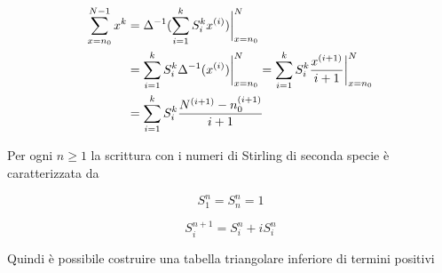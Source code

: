 \begin{example}
	\begin{align*}
		\sum
			\limits_{x=n_0}^{N-1}
			x^k
		&=
		\Delta^{-1}(
			\sum\limits_{i=1}^{k}
				S_{i}^{k}
				x^{(i)}
		)
		\bigg\rvert_{x=n_0}^{N}
		\\
		&=
		\sum\limits_{i=1}^{k}
			S_{i}^{k}
			\Delta^{-1}(
				x^{(i)}
			)
		\bigg\rvert_{x=n_0}^{N}
		=
		\sum\limits_{i=1}^{k}
			S_{i}^{k}
			\frac{
				x^{(i+1)}
			}{
				i+1
			}
		\bigg\rvert_{x=n_0}^{N}
		\\
		&=
		\sum\limits_{i=1}^{k}
			S_{i}^{k}
			\frac{
				N^{(i+1)} - n_0^{(i+1)}
			}{
				i+1
			}
	\end{align*}
\end{example}

\begin{theorem}
	Per ogni $n \geq 1$ la scrittura con i numeri di Stirling di seconda specie è caratterizzata da 
	
	$$ S_{1}^{n} = S_{n}^{n} = 1$$
	
	$$ S_{i}^{n+1} = S_{i}^{n} + i S_{i}^{n}$$
	
	Quindi è possibile costruire una tabella triangolare inferiore di termini positivi
		
\end{theorem}

